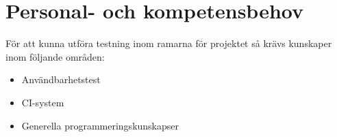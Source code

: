 \section{Personal- och kompetensbehov}
För att kunna utföra testning inom ramarna för projektet så krävs kunskaper inom följande områden:
\begin{itemize}
\item Användbarhetstest
\item CI-system
\item Generella programmeringskunskapser
\end{itemize}